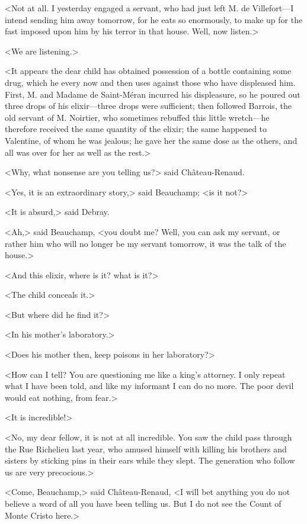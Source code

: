  <Not at all. I yesterday engaged a servant, who had just left M. de Villefort—I intend sending him away tomorrow, for he eats so enormously, to make up for the fast imposed upon him by his terror in that house. Well, now listen.> 

 <We are listening.> 

 <It appears the dear child has obtained possession of a bottle containing some drug, which he every now and then uses against those who have displeased him. First, M. and Madame de Saint-Méran incurred his displeasure, so he poured out three drops of his elixir—three drops were sufficient; then followed Barrois, the old servant of M. Noirtier, who sometimes rebuffed this little wretch—he therefore received the same quantity of the elixir; the same happened to Valentine, of whom he was jealous; he gave her the same dose as the others, and all was over for her as well as the rest.> 

 <Why, what nonsense are you telling us?> said Château-Renaud. 

 <Yes, it is an extraordinary story,> said Beauchamp; <is it not?> 

 <It is absurd,> said Debray. 

 <Ah,> said Beauchamp, <you doubt me? Well, you can ask my servant, or rather him who will no longer be my servant tomorrow, it was the talk of the house.> 

 <And this elixir, where is it? what is it?> 

 <The child conceals it.> 

 <But where did he find it?> 

 <In his mother's laboratory.> 

 <Does his mother then, keep poisons in her laboratory?> 

 <How can I tell? You are questioning me like a king's attorney. I only repeat what I have been told, and like my informant I can do no more. The poor devil would eat nothing, from fear.> 

 <It is incredible!> 

 <No, my dear fellow, it is not at all incredible. You saw the child pass through the Rue Richelieu last year, who amused himself with killing his brothers and sisters by sticking pins in their ears while they slept. The generation who follow us are very precocious.> 

 <Come, Beauchamp,> said Château-Renaud, <I will bet anything you do not believe a word of all you have been telling us. But I do not see the Count of Monte Cristo here.> 

